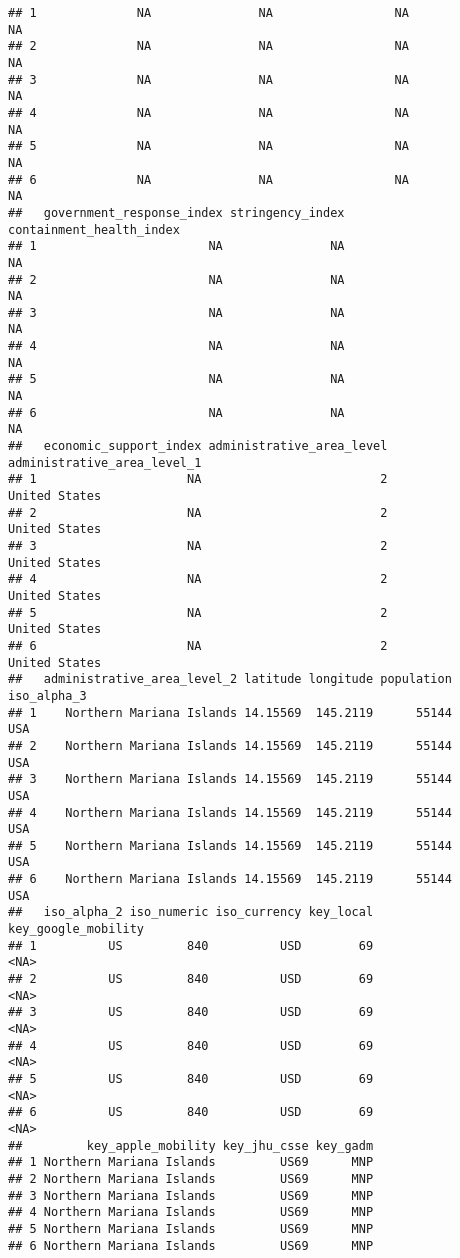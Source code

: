 \documentclass[
]{book}
\begin{document}
\begin{verbatim}
## 1              NA               NA                 NA                        NA
## 2              NA               NA                 NA                        NA
## 3              NA               NA                 NA                        NA
## 4              NA               NA                 NA                        NA
## 5              NA               NA                 NA                        NA
## 6              NA               NA                 NA                        NA
##   government_response_index stringency_index containment_health_index
## 1                        NA               NA                       NA
## 2                        NA               NA                       NA
## 3                        NA               NA                       NA
## 4                        NA               NA                       NA
## 5                        NA               NA                       NA
## 6                        NA               NA                       NA
##   economic_support_index administrative_area_level administrative_area_level_1
## 1                     NA                         2               United States
## 2                     NA                         2               United States
## 3                     NA                         2               United States
## 4                     NA                         2               United States
## 5                     NA                         2               United States
## 6                     NA                         2               United States
##   administrative_area_level_2 latitude longitude population iso_alpha_3
## 1    Northern Mariana Islands 14.15569  145.2119      55144         USA
## 2    Northern Mariana Islands 14.15569  145.2119      55144         USA
## 3    Northern Mariana Islands 14.15569  145.2119      55144         USA
## 4    Northern Mariana Islands 14.15569  145.2119      55144         USA
## 5    Northern Mariana Islands 14.15569  145.2119      55144         USA
## 6    Northern Mariana Islands 14.15569  145.2119      55144         USA
##   iso_alpha_2 iso_numeric iso_currency key_local key_google_mobility
## 1          US         840          USD        69                <NA>
## 2          US         840          USD        69                <NA>
## 3          US         840          USD        69                <NA>
## 4          US         840          USD        69                <NA>
## 5          US         840          USD        69                <NA>
## 6          US         840          USD        69                <NA>
##         key_apple_mobility key_jhu_csse key_gadm
## 1 Northern Mariana Islands         US69      MNP
## 2 Northern Mariana Islands         US69      MNP
## 3 Northern Mariana Islands         US69      MNP
## 4 Northern Mariana Islands         US69      MNP
## 5 Northern Mariana Islands         US69      MNP
## 6 Northern Mariana Islands         US69      MNP
\end{verbatim}
\end{document}
